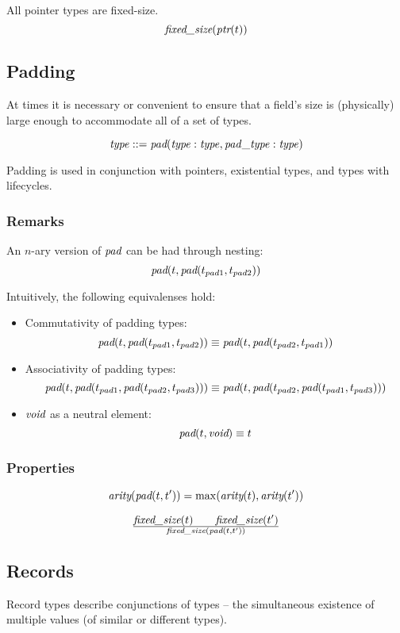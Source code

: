\documentclass[a4paper]{report}
\newcommand\arity{{\ensuremath\textit{arity}}}
\newcommand\fixedsize{{\ensuremath\textit{fixed\_size}}}
\newcommand\tyPtr{{\ensuremath\textit{ptr}}}
\newcommand\tyPad{{\ensuremath\textit{pad}}}
\newcommand\tyVoid{{\ensuremath\textit{void}}}
\begin{document}
All pointer types are fixed-size.
$$\fixedsize(\tyPtr(t))$$

\subsection{Padding}
At times it is necessary or convenient to ensure that a field's size is
(physically) large enough to accommodate all of a set of types.

$$\it type ::= \tyPad(type : type, pad\_type : type)$$

Padding is used in conjunction with pointers, existential types,
and types with lifecycles.

\subsubsection*{Remarks}
An $n$-ary version of $\tyPad$ can be had through nesting:
$$\tyPad(t, \tyPad(t_{pad1}, t_{pad2}))$$

\noindent
Intuitively, the following equivalenses hold:

\begin{itemize}
\item Commutativity of padding types:
$$\tyPad(t, \tyPad(t_{pad1}, t_{pad2})) \equiv
  \tyPad(t, \tyPad(t_{pad2}, t_{pad1}))$$

\item Associativity of padding types:
$$\tyPad(t, \tyPad(t_{pad1}, \tyPad(t_{pad2}, t_{pad3}))) \equiv
\tyPad(t, \tyPad(t_{pad2}, \tyPad(t_{pad1}, t_{pad3})))$$

\item $\tyVoid$ as a neutral element:
$$\tyPad(t, \tyVoid) \equiv t$$

\end{itemize}

\subsubsection*{Properties}
$$ \arity(\tyPad(t, t')) = \max(\arity(t), \arity(t'))$$


$${\fixedsize(t) \qquad \fixedsize(t')}
 \over
\fixedsize(\tyPad(t, t'))$$

\subsection{Records}
Record types describe conjunctions of types -- the simultaneous
existence of multiple values (of similar or different types).
\end{document}
